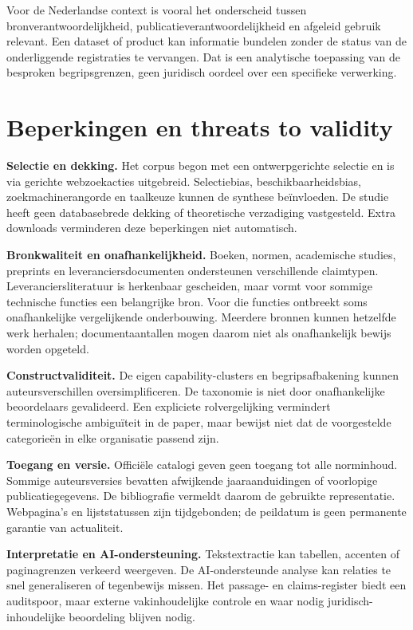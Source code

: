 Voor de Nederlandse context is vooral het onderscheid tussen bronverantwoordelijkheid, publicatieverantwoordelijkheid en afgeleid gebruik relevant. Een dataset of product kan informatie bundelen zonder de status van de onderliggende registraties te vervangen. Dat is een analytische toepassing van de besproken begripsgrenzen, geen juridisch oordeel over een specifieke verwerking. \parencite{S25,S47,S51}

\section{Beperkingen en threats to validity}
\textbf{Selectie en dekking.} Het corpus begon met een ontwerpgerichte selectie en is via gerichte webzoekacties uitgebreid. Selectiebias, beschikbaarheidsbias, zoekmachinerangorde en taalkeuze kunnen de synthese beïnvloeden. De studie heeft geen databasebrede dekking of theoretische verzadiging vastgesteld. Extra downloads verminderen deze beperkingen niet automatisch.

\textbf{Bronkwaliteit en onafhankelijkheid.} Boeken, normen, academische studies, preprints en leveranciersdocumenten ondersteunen verschillende claimtypen. Leveranciersliteratuur is herkenbaar gescheiden, maar vormt voor sommige technische functies een belangrijke bron. Voor die functies ontbreekt soms onafhankelijke vergelijkende onderbouwing. Meerdere bronnen kunnen hetzelfde werk herhalen; documentaantallen mogen daarom niet als onafhankelijk bewijs worden opgeteld.

\textbf{Constructvaliditeit.} De eigen capability-clusters en begripsafbakening kunnen auteursverschillen oversimplificeren. De taxonomie is niet door onafhankelijke beoordelaars gevalideerd. Een expliciete rolvergelijking vermindert terminologische ambiguïteit in de paper, maar bewijst niet dat de voorgestelde categorieën in elke organisatie passend zijn.

\textbf{Toegang en versie.} Officiële catalogi geven geen toegang tot alle norminhoud. Sommige auteursversies bevatten afwijkende jaaraanduidingen of voorlopige publicatiegegevens. De bibliografie vermeldt daarom de gebruikte representatie. Webpagina's en lijststatussen zijn tijdgebonden; de peildatum is geen permanente garantie van actualiteit.

\textbf{Interpretatie en AI-ondersteuning.} Tekstextractie kan tabellen, accenten of paginagrenzen verkeerd weergeven. De AI-ondersteunde analyse kan relaties te snel generaliseren of tegenbewijs missen. Het passage- en claims-register biedt een auditspoor, maar externe vakinhoudelijke controle en waar nodig juridisch-inhoudelijke beoordeling blijven nodig.

